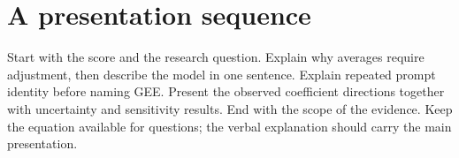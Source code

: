 \section*{A presentation sequence}
Start with the score and the research question. Explain why averages require adjustment, then describe the model in one sentence. Explain repeated prompt identity before naming GEE. Present the observed coefficient directions together with uncertainty and sensitivity results. End with the scope of the evidence. Keep the equation available for questions; the verbal explanation should carry the main presentation.
